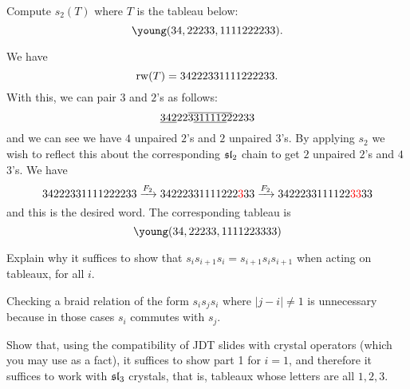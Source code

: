 \documentclass[12pt]{memoir}
\begin{document}
\begin{Ej}[Exercise 1.a]
Compute $s_2(T)$ where $T$ is the tableau below:
$$\young(34,22233,1111222233).$$    
\end{Ej}

\begin{ptcbr}
    We have 
    $$\operatorname{rw}(T)=34222331111222233.$$
    With this, we can pair $3$ and $2$'s as follows:
    $$\underline{342}22\overline{3\underline{311112}2}2233$$
    and we can see we have $4$ unpaired $2$'s and $2$ unpaired $3$'s. By applying $s_2$ we wish to reflect this about the corresponding $\mathfrak{sl}_2$ chain to get $2$ unpaired $2$'s and $4$ $3$'s. We have 
    $$34222331111222233\xrightarrow{F_2}34222331111222\textcolor{red}{3}33\xrightarrow{F_2}3422233111122\textcolor{red}{33}33$$
    and this is the desired word. The corresponding tableau is 
    $$\young(34,22233,1111223333)$$
\end{ptcbr}

\begin{Ej}[Exercise 1.b]
    Explain why it suffices to show that $s_is_{i+1}s_i=s_{i+1}s_is_{i+1}$ when acting on tableaux, for all $i$.
\end{Ej}

\begin{ptcbr}
Checking a braid relation of the form $s_is_js_i$ where $|j-i|\neq 1$ is unnecessary because in those cases $s_i$ commutes with $s_j$.    
\end{ptcbr}

\begin{Ej}[Exercise 1.c]
    Show that, using the compatibility of JDT slides with crystal operators (which you may use as a fact), it suﬃces to show part 1 for $i = 1$, and therefore it suﬃces to work with $\mathfrak{sl}_3$ crystals, that is, tableaux whose letters are all $1, 2, 3$.
\end{Ej}
\end{document}
